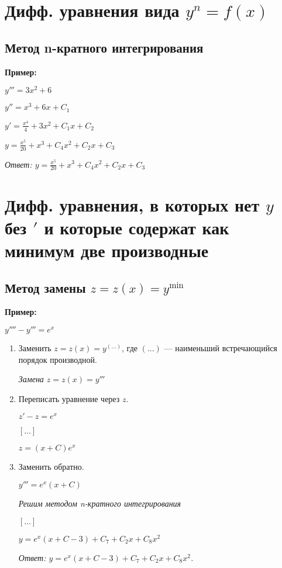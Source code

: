 \documentclass[10pt, a4paper]{article}
\begin{document}
\section{Дифф. уравнения вида $y^{n} = f(x)$}
\subsection{Метод n-кратного интегрирования}
\textbf{Пример:}
    \par $y''' = 3x^2 + 6$
    \par $y''  = x^3 + 6x + C_{1}$
    \par $y'   = \frac{x^4}{4} + 3x^2 + C_{1}x + C_{2}$
    \par $y    = \frac{x^5}{20} + x^3 + C_{4}x^2 + C_{2}x + C_{3}$
    \par\textit{Ответ: $y = \frac{x^5}{20} + x^3 + C_{4}x^2 + C_{2}x + C_{3}$}

\section{Дифф. уравнения, в которых нет $y$ без $'$ и которые содержат как минимум две производные}
\subsection{Метод замены $z = z(x) = y^{\min}$}
\textbf{Пример:}
\par $y'''' - y''' = e^x$
\begin{enumerate}
    \item Заменить $z = z(x) = y^{(...)}$, где $(...)$ — наименьший встречающийся порядок производной.
        \par\textit{Замена $z = z(x) = y'''$}
    \item Переписать уравнение через $z$.
        \par $z' - z = e^x$
        \par $[...]$
        \par $z = (x + C)e^x$
    \item Заменить обратно.
        \par $y''' = e^x(x + C)$
        \par\textit{Решим методом n-кратного интегрирования}
        \par $[...]$
        \par $y = e^x(x + C - 3) + C_{7} + C_{2}x + C_{8}x^2$
        \par\textit{Ответ: $y = e^x(x + C - 3) + C_{7} + C_{2}x + C_{8}x^2$.}
\end{enumerate}
\end{document}
